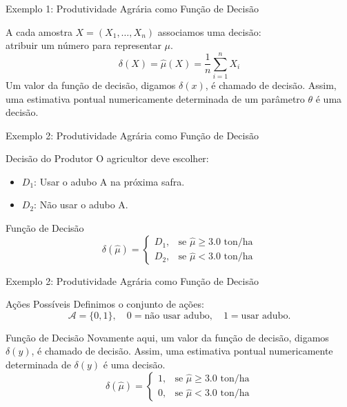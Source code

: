 \documentclass[12pt]{beamer}
\begin{document}
\begin{frame}{Exemplo 1: Produtividade Agrária como Função de Decisão}
	
	\begin{block}{}
		\justifying
		A cada amostra $X=(X_1,\dots,X_n)$ associamos uma decisão: \\
		atribuir um número para representar $\mu$.
		\[
		\delta(X) = \hat{\mu}(X) = \frac{1}{n}\sum_{i=1}^n X_i
		\]
		Um valor da função de decisão, digamos $\delta(x)$, é chamado de decisão. Assim, uma estimativa pontual numericamente determinada de um parâmetro $\theta$ é uma decisão. 
	\end{block}
\end{frame}

\begin{frame}{Exemplo 2: Produtividade Agrária como Função de Decisão}
	\begin{block}{Decisão do Produtor}
		O agricultor deve escolher:
		\begin{itemize}
			\item $D_1$: Usar o adubo A na próxima safra.
			\item $D_2$: Não usar o adubo A.
		\end{itemize}
	\end{block}
	\pause
	\begin{block}{Função de Decisão}
		\[
		\delta(\hat{\mu}) = 
		\begin{cases}
			D_1, & \text{se } \hat{\mu} \geq 3.0 \text{ ton/ha} \\
			D_2, & \text{se } \hat{\mu} < 3.0 \text{ ton/ha}
		\end{cases}
		\]
	\end{block}
\end{frame}

\begin{frame}{Exemplo 2: Produtividade Agrária como Função de Decisão}
	\begin{block}{Ações Possíveis}
		Definimos o conjunto de ações:
		\[
		\mathcal{A} = \{0,1\}, \quad
		0 = \text{não usar adubo}, \quad
		1 = \text{usar adubo}.
		\]
	\end{block}
	
	\begin{block}{Função de Decisão}
		Novamente aqui, um valor da função de decisão, digamos $\delta(y)$, é chamado de decisão. Assim, uma estimativa pontual numericamente determinada de $\delta(y)$ é uma decisão. 
		\[
		\delta(\hat{\mu}) =
		\begin{cases}
			1, & \text{se } \hat{\mu} \geq 3.0 \text{ ton/ha} \\
			0, & \text{se } \hat{\mu} < 3.0 \text{ ton/ha}
		\end{cases}
		\]
	\end{block}
\end{frame}
\end{document}
